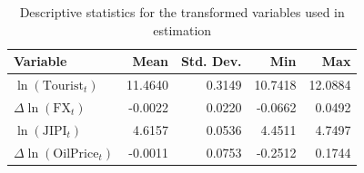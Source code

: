 \begin{table}[H]
\centering
\caption{Descriptive statistics for the transformed variables used in estimation}
\label{tab:summary-stats}
\begin{tabular}{lrrrr}
\toprule
Variable & Mean & Std. Dev. & Min & Max \\
\midrule
$\ln(\mathrm{Tourist}_t)$ & 11.4640 & 0.3149 & 10.7418 & 12.0884 \\
$\Delta \ln(\mathrm{FX}_t)$ & -0.0022 & 0.0220 & -0.0662 & 0.0492 \\
$\ln(\mathrm{JIPI}_t)$ & 4.6157 & 0.0536 & 4.4511 & 4.7497 \\
$\Delta \ln(\mathrm{OilPrice}_t)$ & -0.0011 & 0.0753 & -0.2512 & 0.1744 \\
\bottomrule
\end{tabular}
\end{table}
